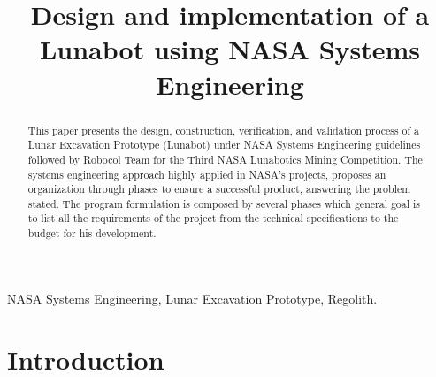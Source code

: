 \documentclass[conference]{IEEEtran}
\begin{document}
\hypersetup{pdfborder=0 0 0}
\title{Design and implementation of a Lunabot using NASA Systems Engineering}


\author{
}
 
\maketitle


\begin{abstract} %
This paper presents  the design, construction, verification, and validation process of a Lunar Excavation Prototype (Lunabot) under NASA Systems Engineering guidelines followed by Robocol Team for the Third NASA Lunabotics Mining Competition. The systems engineering approach highly applied in NASA's projects, proposes an organization through phases to ensure a successful product, answering the problem stated. The program formulation is composed by several phases which general goal is to list all the requirements of the project from the technical specifications to the budget for his development. 
\end{abstract}

\begin{IEEEkeywords}
NASA Systems Engineering, Lunar Excavation Prototype, Regolith.
\end{IEEEkeywords}

\IEEEpeerreviewmaketitle

\section{Introduction}%
\end{document}
